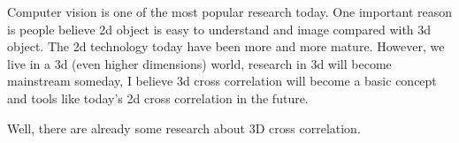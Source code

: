 Computer vision is one of the most popular research today. One important reason is people believe 2d object is easy to understand and image compared with 3d object. The 2d technology today have been more and more mature. However, we live in a 3d (even higher dimensions) world, research in 3d will become mainstream someday, I believe 3d cross correlation will become a basic concept and tools like today's 2d cross correlation in the future. 

Well, there are already some research about 3D cross correlation\cite{Li2002Auto}\cite{article2013}.